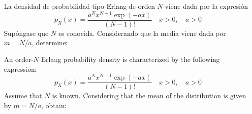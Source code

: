 \ifspanish

\question La densidad de probabilidad tipo Erlang de orden $N$ viene dada por la expresión
 $$p_X(x)=\frac{a^N x^{N-1} \exp (-ax)}{(N-1)!} \quad  x >0, \quad   a>0 $$
Supóngase que $N$ es conocida. Considerando que la media viene dada por $m = N/a$, determine: 

\begin{solution}
\end{solution}

\else

\question An order-$N$ Erlang probability density is characterized by the following expression:
  $$p_X(x)=\frac{a^N x^{N-1} \exp (-ax)}{(N-1)!} \quad  x >0, \quad   a>0 $$
Assume that $N$ is known.  Considering that the mean of the distribution is given by $m = N/a$, obtain: 

